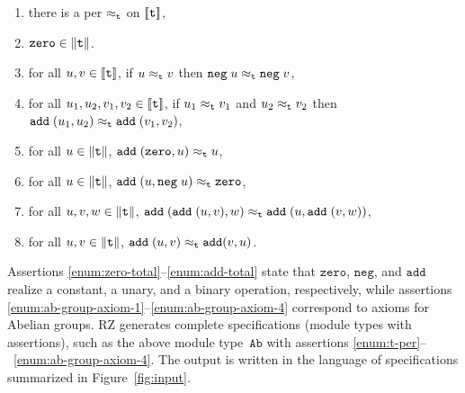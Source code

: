 \begin{enumerate}
\item
  \label{enum:t-per}%
  there is a per $\approx_{\mathtt{t}}$ on $[\![\mathtt{t}]\!]$,
\item
  \label{enum:zero-total}%
  $\mathtt{zero} \in \|\mathtt{t}\|$.
\item
  \label{enum:neg-total}%
  for all $u, v \in [\![\mathtt{t}]\!]$, if $u \approx_{\mathtt{t}} v$ then
  $\mathtt{neg} \; u \approx_{\mathtt{t}} \mathtt{neg} \; v$,
\item
  \label{enum:add-total}%
  for all $u_1, u_2, v_1, v_2 \in [\![\mathtt{t}]\!]$, if $u_1
  \approx_{\mathtt{t}} v_1$ and $u_2 \approx_{\mathtt{t}} v_2$ then $\mathtt{add} \; (u_1,
  u_2) \approx_{\mathtt{t}} \mathtt{add} \; (v_1, v_2)$,
\item 
  \label{enum:ab-group-axiom-1}%
  for all $u \in \|\mathtt{t}\|$, $\mathtt{add} \;
  (\mathtt{zero}, u) \approx_{\mathtt{t}} u$,
\item
  \label{enum:ab-group-axiom-2}%
  for all $u \in \|\mathtt{t}\|$, $\mathtt{add} \; (u,
  \mathtt{neg} \; u) \approx_{\mathtt{t}} \mathtt{zero}$,
\item
  \label{enum:ab-group-axiom-3}%
  for all $u, v, w \in \|\mathtt{t}\|$, $\mathtt{add} \;
  (\mathtt{add} \; (u, v), w) \approx_{\mathtt{t}} \mathtt{add} \; (u,
  \mathtt{add} \; (v, w))$,
\item
  \label{enum:ab-group-axiom-4}%
  for all $u, v \in \|\mathtt{t}\|$, $\mathtt{add} \; (u, v)
  \approx_{\mathtt{t}} \mathtt{add} (v, u)$.
\end{enumerate}
%
Assertions \ref{enum:zero-total}--\ref{enum:add-total} state that
$\mathtt{zero}$, $\mathtt{neg}$, and $\mathtt{add}$ realize a
constant, a unary, and a binary operation, respectively, while
assertions \ref{enum:ab-group-axiom-1}--\ref{enum:ab-group-axiom-4}
correspond to axioms for Abelian groups. RZ generates complete
specifications (module types with assertions), such as the above
module type~$\mathtt{Ab}$ with assertions
\ref{enum:t-per}--~\ref{enum:ab-group-axiom-4}. The output is written
in the language of specifications summarized in
Figure~\ref{fig:input}.

